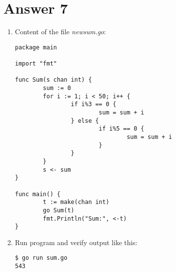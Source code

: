 \documentclass[11pt,a4paper]{article}
\begin{document}
\newpage

\section*{Answer 7}
\begin{enumerate}
\item Content of the file {\it newsum.go}:
\begin{verbatim}
package main

import "fmt"

func Sum(s chan int) {
        sum := 0
        for i := 1; i < 50; i++ {
                if i%3 == 0 {
                        sum = sum + i
                } else {
                        if i%5 == 0 {
                                sum = sum + i
                        }
                }
        }
        s <- sum
}

func main() {
        t := make(chan int)
        go Sum(t)
        fmt.Println("Sum:", <-t)
}
\end{verbatim}

\item Run program and verify output like this:
\begin{verbatim}
$ go run sum.go
543
\end{verbatim}

\end{enumerate}
\end{document}
